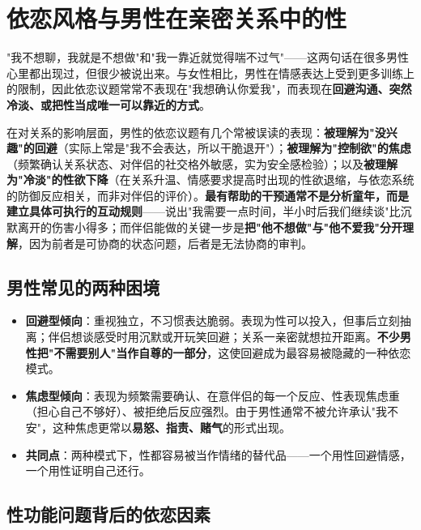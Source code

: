 \section{依恋风格与男性在亲密关系中的性}

"我不想聊，我就是不想做"和"我一靠近就觉得喘不过气"——这两句话在很多男性心里都出现过，但很少被说出来。与女性相比，男性在情感表达上受到更多训练上的限制，因此依恋议题常常不表现在"我想确认你爱我"，而表现在\textbf{回避沟通、突然冷淡、或把性当成唯一可以靠近的方式}。


在对关系的影响层面，男性的依恋议题有几个常被误读的表现：\textbf{被理解为"没兴趣"的回避}（实际上常是"我不会表达，所以干脆退开"）；\textbf{被理解为"控制欲"的焦虑}（频繁确认关系状态、对伴侣的社交格外敏感，实为安全感检验）；以及\textbf{被理解为"冷淡"的性欲下降}（在关系升温、情感要求提高时出现的性欲退缩，与依恋系统的防御反应相关，而非对伴侣的评价）。\textbf{最有帮助的干预通常不是分析童年，而是建立具体可执行的互动规则}——说出"我需要一点时间，半小时后我们继续谈"比沉默离开的伤害小得多；而伴侣能做的关键一步是\textbf{把"他不想做"与"他不爱我"分开理解}，因为前者是可协商的状态问题，后者是无法协商的审判。

\subsection{男性常见的两种困境}

\begin{itemize}
	\item \textbf{回避型倾向}：重视独立，不习惯表达脆弱。表现为性可以投入，但事后立刻抽离；伴侣想谈感受时用沉默或开玩笑回避；关系一亲密就想拉开距离。\textbf{不少男性把"不需要别人"当作自尊的一部分}，这使回避成为最容易被隐藏的一种依恋模式。
	\item \textbf{焦虑型倾向}：表现为频繁需要确认、在意伴侣的每一个反应、性表现焦虑重（担心自己不够好）、被拒绝后反应强烈。由于男性通常不被允许承认"我不安"，这种焦虑更常以\textbf{易怒、指责、赌气}的形式出现。
	\item \textbf{共同点}：两种模式下，性都容易被当作情绪的替代品——一个用性回避情感，一个用性证明自己还行。
\end{itemize}

\subsection{性功能问题背后的依恋因素}

